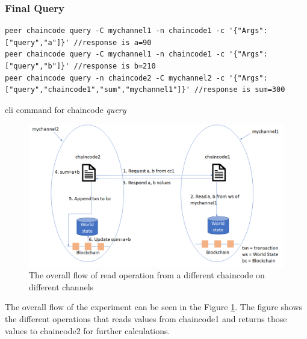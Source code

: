 \documentclass[
  a4paper,  %
  twoside,  %
  bibliography=totoc,
  headsepline,
  cleardoublepage=empty,
  parskip=half,
  draft=false
]{scrbook}
\begin{document}
\subsubsection{Final Query}
\begin{Listing}[h!]
\begin{lstlisting}
peer chaincode query -C mychannel1 -n chaincode1 -c '{"Args":["query","a"]}' //response is a=90
peer chaincode query -C mychannel1 -n chaincode1 -c '{"Args":["query","b"]}' //response is b=210
peer chaincode query -n chaincode2 -C mychannel2 -c '{"Args":["query","chaincode1","sum","mychannel1"]}' //response is sum=300
\end{lstlisting}
\caption{cli command for chaincode \textit{query}}
\label{lst:cf2}
\end{Listing}
\begin{figure}[h!]
\begin{center}
\includegraphics[width=\textwidth]{graphics/readsc2.png}
\caption{The overall flow of read operation from a different chaincode on different channels}
\label{fig:readsc2}
\end{center}
\end{figure}
The overall flow of the experiment can be seen in the Figure \ref{fig:readsc2}. The figure shows the different operations that reads values from chaincode1 and returns those values to chaincode2 for further calculations.
\end{document}
